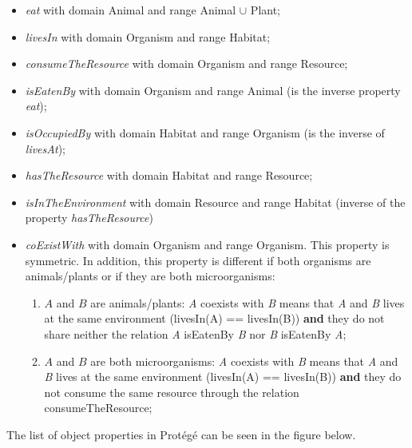     \begin{itemize}
        \item \textit{eat} with domain Animal and range Animal $\cup$ Plant;

        \item \textit{livesIn} with domain Organism and range Habitat;

        \item \textit{consumeTheResource} with domain Organism and range Resource;

        \item \textit{isEatenBy} with domain Organism and range Animal (is the inverse property \textit{eat});

        \item \textit{isOccupiedBy} with domain Habitat and range Organism (is the inverse of \textit{livesAt});

        \item \textit{hasTheResource} with domain Habitat and range Resource;

        \item \textit{isInTheEnvironment} with domain Resource and range Habitat (inverse of the property \textit{hasTheResource})

        \item \textit{coExistWith} with domain Organism and range Organism. This property is symmetric. In addition, this property is different if both organisms are animals/plants or if they are both microorganisms:
        \begin{enumerate}
            \item $A$ and $B$ are animals/plants: \textit{A} coexists with \textit{B} means that \textit{A} and \textit{B} lives at the same environment (livesIn(A) == livesIn(B)) \textbf{and} they do not share neither the relation \textit{A} isEatenBy \textit{B} nor \textit{B} isEatenBy \textit{A};

            \item $A$ and $B$ are both microorganisms: \textit{A} coexists with \textit{B} means that \textit{A} and \textit{B} lives at the same environment (livesIn(A) == livesIn(B)) \textbf{and} they do not consume the same resource through the relation consumeTheResource;
            \\
            
        \end{enumerate}
    \end{itemize}

The list of object properties in Protégé can be seen in the figure below.

